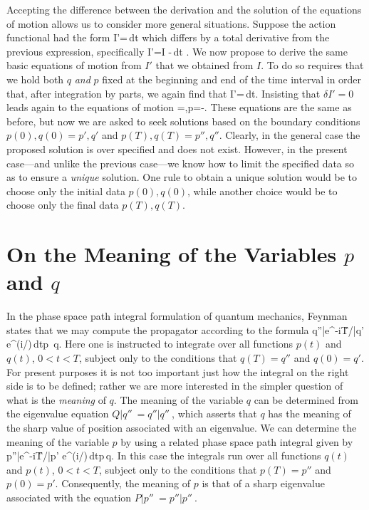 Accepting the difference between the derivation and the solution of the 
equations of motion allows us to consider more general situations. 
Suppose the action functional had the form
  \bn I'=\,dt  \en
which differs by a total derivative from the previous expression, 
specifically
  \bn  I'=I -\half\tint [d(pq)/dt]\,dt \;.  \en
We now propose to derive the same basic equations of motion from $I'$ that 
we obtained from $I$. To do so requires that we hold both $q$ 
{\it and} $p$ fixed at the beginning and end of the time interval in 
order that, after integration by parts, we again find that
  \bn \delta I'=\,dt\;.  \en
Insisting that $\delta I'=0$ leads again to the equations of motion
  =\;,\hskip1cm{\dot p}=-\;. \en
These equations are the same as before, but now we are asked to seek 
solutions based on the boundary conditions $p(0),q(0)=p',q'$ and 
$p(T),q(T)=p'',q''$. Clearly, in the general case the proposed solution 
is over specified and does not exist. However, in the present case---and 
unlike the previous case---we know how to limit the specified data so as 
to ensure a {\it unique} solution. One rule to obtain a unique solution 
would be to choose only the initial data $p(0),q(0)$, while another 
choice would be to choose only the final data $p(T),q(T)$.

\section{On the Meaning of the Variables $p$ and $q$}
In the phase space path integral formulation of quantum mechanics, 
Feynman \cite{fey} states that we may compute the propagator according 
to the formula
 \bn \<q''|\s e^{-i\H T/\hbar}\s|q'\>\int 
e^{(i/\hbar)\tint[p\s{\dot q}-H(p,q)]\,dt}\;\D p\, \D q\;.  \label{e12}\en
Here one is instructed to integrate over all functions $p(t)$ and 
$q(t)$, $0<t<T$, subject only to the conditions that $q(T)=q''$ and 
$q(0)=q'$. 
For present purposes it is not too important just how the integral on 
the right side is to be defined; rather we are more interested in the 
simpler question of what is the {\it meaning} of $q$. The meaning of the 
variable $q$ can be determined from the eigenvalue equation 
$Q|q''\>=q''|q''\>$, which asserts that $q$ has the meaning of the 
sharp value of position associated with an eigenvalue. We can determine 
the meaning of the variable $p$ by using a related phase space path 
integral given by
  \bn \<p''|\s e^{-i\H T/\hbar}\s|p'\>\int 
e^{(i/\hbar)\tint[-q\s{\dot p}-H(p,q)]\,dt}\;\D p\,\D q\;.  \label{e13}\en
In this case the integrals run over all functions $q(t)$ and $p(t)$, 
$0<t<T$, subject only to the conditions that $p(T)=p''$ and $p(0)=p'$. 
Consequently, the meaning of $p$ is that of a sharp eigenvalue associated 
with the equation $P|p''\>=p''|p''\>$.

